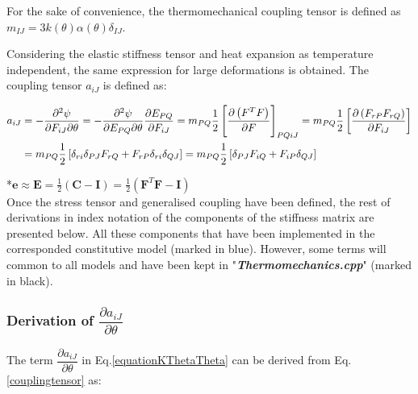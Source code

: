 \documentclass[oneside,11pt,times]{book}
\begin{document}

For the sake of convenience, the thermomechanical coupling tensor is defined as $m_{IJ}=3k(\theta)\alpha(\theta)\delta_{IJ}$.

Considering the elastic stiffness tensor and heat expansion as temperature independent, the same expression for large deformations is obtained. The coupling tensor $a_{iJ}$ is defined as:

\begin{equation}
\begin{aligned}
\centering
a_{iJ}&=-\frac{\partial^2\psi}{\partial {F}_{iJ}\partial \theta}=-\frac{\partial^2\psi}{\partial {E}_{PQ}\partial \theta}\frac{\partial{E}_{PQ}}{\partial {F}_{iJ}}=m_{PQ}\frac{1}{2}\left[\frac{\partial\left(F^TF\right)}{\partial F}\right]_{PQiJ}=m_{PQ}\frac{1}{2}\left[\frac{\partial\left(F_{rP}F_{rQ}\right)}{\partial F_{iJ}}\right]\\&=m_{PQ}\frac{1}{2}\left[\delta_{ri}\delta_{PJ}F_{rQ}+F_{rP}\delta_{ri}\delta_{QJ}\right]=m_{PQ}\frac{1}{2}\left[\delta_{PJ}F_{iQ}+F_{iP}\delta_{QJ}\right]
\end{aligned}
\label{couplingtensor}
\end{equation}


*$\boldsymbol{e}\approx\boldsymbol{E}=\frac{1}{2}\left(\bm{C}-\bm{I}\right)=\frac{1}{2}\left(\bm{F}^T\bm{F}-\bm{I} \right)$
\\
Once the stress tensor and generalised coupling have been defined, the rest of derivations in index notation of the components of the stiffness matrix are presented below. All these components that have been implemented in the corresponded constitutive model (marked in blue). However, some terms will common to all models and have been kept in "\textbf{\textit{Thermomechanics.cpp}}" (marked in black).
\subsubsection{Derivation of $\dfrac{\partial{a_{iJ}}}{\partial{\theta}}$}

The term $\dfrac{\partial{a_{iJ}}}{\partial{\theta}}$ in Eq.\eqref{equationKThetaTheta} can be derived from Eq.\eqref{couplingtensor} as:
\end{document}
